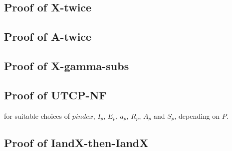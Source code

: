 \subsection{Proof of X-twice}


\subsection{Proof of A-twice}


\subsection{Proof of X-gamma-subs}


\subsection{Proof of UTCP-NF}

for suitable choices of $pindex$, $I_p$, $E_p$, $a_p$, $R_p$, $A_p$ and $S_p$,
depending on $P$.


\subsection{Proof of IandX-then-IandX}

